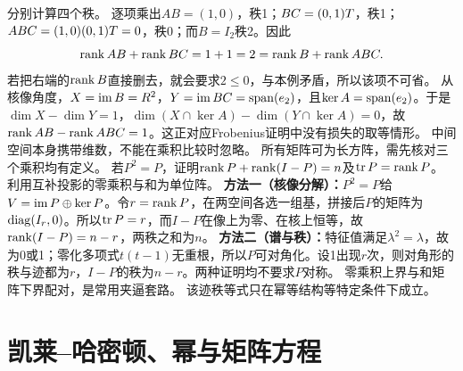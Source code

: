 {分别计算四个秩。}
{逐项乘出$AB=(1,0)$，秩1；$BC=(0,1)T$，秩1；$ABC=(1,0)(0,1)T=0$，秩0；而$B=I_2$秩2。因此
\[\operatorname{rank} AB+\operatorname{rank} BC=1+1=2=\operatorname{rank} B+\operatorname{rank} ABC.\]
若把右端的$\operatorname{rank} B$直接删去，就会要求$2\le0$，与本例矛盾，所以该项不可省。
从核像角度，$X=\operatorname{im} B=R^2$，$Y=\operatorname{im} BC=\operatorname{span}(e_2)$，且$\ker A=\operatorname{span}(e_2)$。于是$\dim X-\dim Y=1$，$\dim(X\cap\ker A)-\dim(Y\cap\ker A)=0$，故$\operatorname{rank} AB-\operatorname{rank} ABC=1$。这正对应Frobenius证明中没有损失的取等情形。}
{中间空间本身携带维数，不能在乘积比较时忽略。}
{所有矩阵可为长方阵，需先核对三个乘积均有定义。}
{若$P^2=P$，证明$\operatorname{rank} P+\operatorname{rank}(I-P)=n$及$\operatorname{tr} P=\operatorname{rank} P$。}
{利用互补投影的零乘积与和为单位阵。}
{\textbf{方法一（核像分解）：}$P^2=P$给$V=\operatorname{im} P\oplus\ker P$。令$r=\operatorname{rank} P$，在两空间各选一组基，拼接后$P$的矩阵为$\operatorname{diag}(I_r,0)$。所以$\operatorname{tr} P=r$，而$I-P$在像上为零、在核上恒等，故$\operatorname{rank}(I-P)=n-r$，两秩之和为$n$。
\textbf{方法二（谱与秩）：}特征值满足$\lambda^2=\lambda$，故为0或1；零化多项式$t(t-1)$无重根，所以$P$可对角化。设1出现$r$次，则对角形的秩与迹都为$r$，$I-P$的秩为$n-r$。两种证明均不要求$P$对称。}
{零乘积上界与和矩阵下界配对，是常用夹逼套路。}
{该迹秩等式只在幂等结构等特定条件下成立。}


\section{凯莱--哈密顿、幂与矩阵方程}
